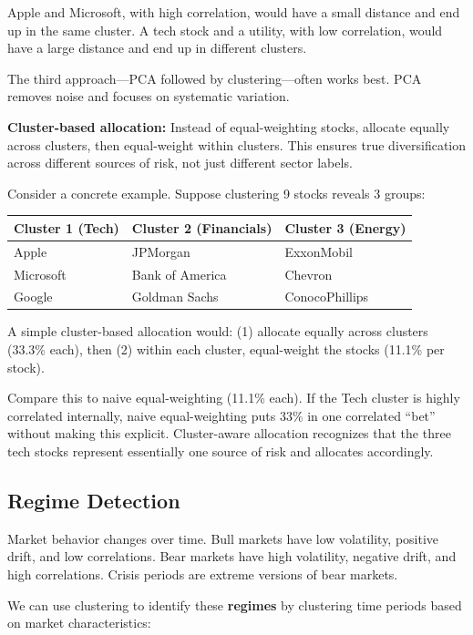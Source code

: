 \documentclass[11pt,a4paper]{article}
\newcommand{\keyword}[1]{\textbf{\textcolor{AccentOrange}{#1}}}
\begin{document}
Apple and Microsoft, with high correlation, would have a small distance and end up in the same cluster. A tech stock and a utility, with low correlation, would have a large distance and end up in different clusters.

The third approach---PCA followed by clustering---often works best. PCA removes noise and focuses on systematic variation.

\textbf{Cluster-based allocation:} Instead of equal-weighting stocks, allocate equally across clusters, then equal-weight within clusters. This ensures true diversification across different sources of risk, not just different sector labels.

Consider a concrete example. Suppose clustering 9 stocks reveals 3 groups:

\begin{center}
\begin{tabular}{lll}
\toprule
\textbf{Cluster 1 (Tech)} & \textbf{Cluster 2 (Financials)} & \textbf{Cluster 3 (Energy)} \\
\midrule
Apple & JPMorgan & ExxonMobil \\
Microsoft & Bank of America & Chevron \\
Google & Goldman Sachs & ConocoPhillips \\
\bottomrule
\end{tabular}
\end{center}

A simple cluster-based allocation would: (1) allocate equally across clusters (33.3\% each), then (2) within each cluster, equal-weight the stocks (11.1\% per stock).

Compare this to naive equal-weighting (11.1\% each). If the Tech cluster is highly correlated internally, naive equal-weighting puts 33\% in one correlated ``bet'' without making this explicit. Cluster-aware allocation recognizes that the three tech stocks represent essentially one source of risk and allocates accordingly.

\subsection{Regime Detection}

Market behavior changes over time. Bull markets have low volatility, positive drift, and low correlations. Bear markets have high volatility, negative drift, and high correlations. Crisis periods are extreme versions of bear markets.

We can use clustering to identify these \keyword{regimes} by clustering time periods based on market characteristics:
\end{document}
